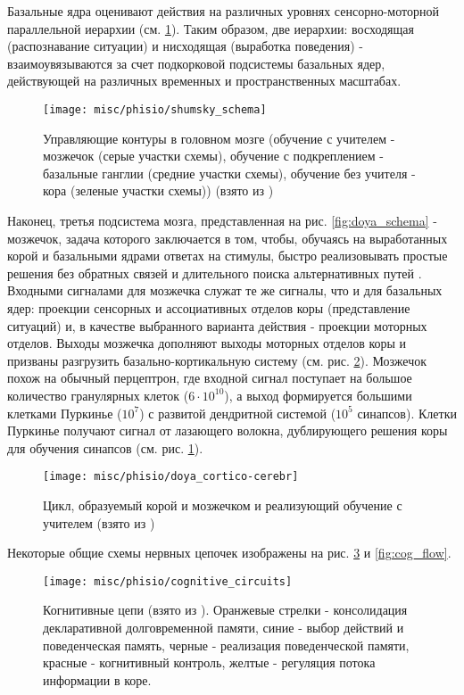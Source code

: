 \documentclass[12pt]{report}
\begin{document}
	Базальные ядра оценивают действия на различных уровнях сенсорно-моторной параллельной иерархии (см. \ref{fig:shumsky_schemas}). Таким образом, две иерархии: восходящая (распознавание ситуации) и нисходящая (выработка поведения) - взаимоувязываются за счет подкорковой подсистемы базальных ядер, действующей на различных временных и пространственных масштабах.
	\begin{figure}
		\centering
		\texttt{[image: misc/phisio/shumsky\_schema]}
		\caption{Управляющие контуры в головном мозге (обучение с учителем - мозжечок (серые участки схемы), обучение с подкреплением - базальные ганглии (средние участки схемы), обучение без учителя - кора (зеленые участки схемы)) (взято из \cite{Shumsky2015b})}
		\label{fig:shumsky_schemas}		
	\end{figure}

	Наконец, третья подсистема мозга, представленная на рис. \ref{fig:doya_schema} - мозжечок, задача которого заключается в том, чтобы, обучаясь на выработанных корой и базальными ядрами ответах на стимулы, быстро реализовывать простые решения без обратных связей и длительного поиска альтернативных путей \cite{Kawato2009}. Входными сигналами для мозжечка служат те же сигналы, что и для базальных ядер: проекции сенсорных и ассоциативных отделов коры (представление ситуаций) и, в качестве выбранного варианта действия -  проекции моторных отделов. Выходы мозжечка дополняют выходы моторных отделов коры и призваны разгрузить базально-кортикальную систему (см. рис. \ref{fig:doya_cortcer}). Мозжечок похож на обычный перцептрон, где входной сигнал поступает на большое количество гранулярных клеток ($6\cdot10^{10}$), а выход формируется большими клетками Пуркинье ($10^7$) с развитой дендритной системой ($10^5$ синапсов). Клетки Пуркинье получают сигнал от лазающего волокна, дублирующего решения коры для обучения синапсов (см. рис. \ref{fig:shumsky_schemas}).
	
	\begin{figure}
		\centering
		\texttt{[image: misc/phisio/doya\_cortico-cerebr]}
		\caption{Цикл, образуемый корой и мозжечком и реализующий обучение с учителем (взято из \cite{Doya2000a})}
		\label{fig:doya_cortcer}		
	\end{figure}
	
	Некоторые общие схемы нервных цепочек изображены на рис. \ref{fig:cog_circ} и \ref{fig:cog_flow}.
	
	\begin{figure}
		\centering
		\texttt{[image: misc/phisio/cognitive\_circuits]}
		\caption{Когнитивные цепи (взято из \cite{Solari2011}). Оранжевые стрелки - консолидация декларативной долговременной памяти, синие - выбор действий и поведенческая память, черные - реализация поведенческой памяти, красные - когнитивный контроль, желтые - регуляция потока информации в коре.}
		\label{fig:cog_circ}		
	\end{figure}
\end{document}
